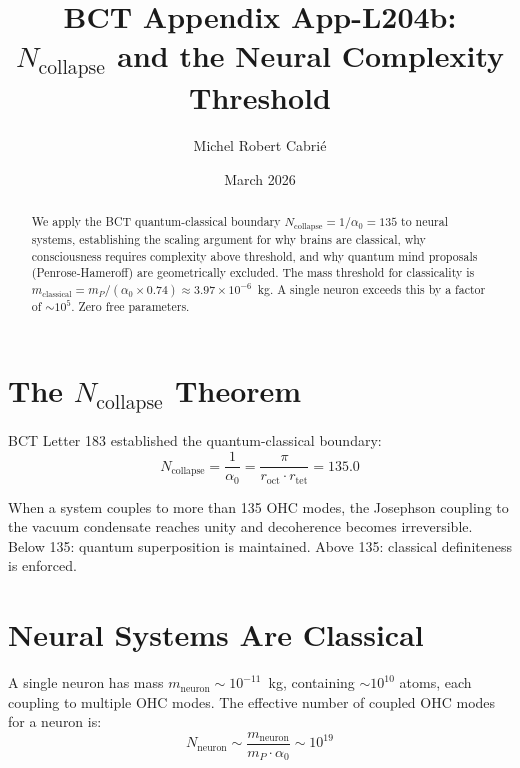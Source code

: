 \documentclass[aps,prl,twocolumn,superscriptaddress]{revtex4-2}
\begin{document}
\title{BCT Appendix App-L204b:\\
$N_{\mathrm{collapse}}$ and the Neural Complexity Threshold}
\author{Michel Robert Cabri\'e}
\date{March 2026}

\begin{abstract}
We apply the BCT quantum-classical boundary $N_{\mathrm{collapse}} = 1/\alpha_0 = 135$ to neural systems, establishing the scaling argument for why brains are classical, why consciousness requires complexity above threshold, and why quantum mind proposals (Penrose-Hameroff) are geometrically excluded. The mass threshold for classicality is $m_{\mathrm{classical}} = m_P / (\alpha_0 \times 0.74) \approx 3.97 \times 10^{-6}$~kg. A single neuron exceeds this by a factor of $\sim 10^5$. Zero free parameters.
\end{abstract}

\maketitle

\section{The $N_{\mathrm{collapse}}$ Theorem}

BCT Letter 183 established the quantum-classical boundary:
\begin{equation}
N_{\mathrm{collapse}} = \frac{1}{\alpha_0} = \frac{\pi}{r_{\mathrm{oct}} \cdot r_{\mathrm{tet}}} = 135.0
\end{equation}

When a system couples to more than 135 OHC modes, the Josephson coupling to the vacuum condensate reaches unity and decoherence becomes irreversible. Below 135: quantum superposition is maintained. Above 135: classical definiteness is enforced.

\section{Neural Systems Are Classical}

A single neuron has mass $m_{\mathrm{neuron}} \sim 10^{-11}$~kg, containing $\sim 10^{10}$ atoms, each coupling to multiple OHC modes. The effective number of coupled OHC modes for a neuron is:
\begin{equation}
N_{\mathrm{neuron}} \sim \frac{m_{\mathrm{neuron}}}{m_P \cdot \alpha_0} \sim 10^{19}
\end{equation}
\end{document}
